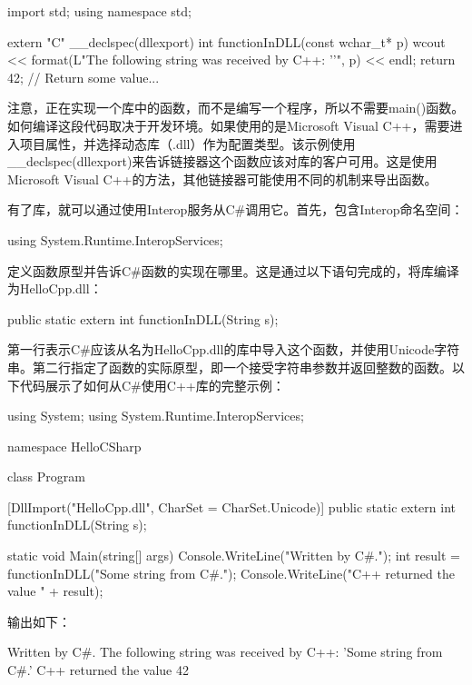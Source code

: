 \begin{cpp}
import std;
using namespace std;

extern "C"
{
    __declspec(dllexport) int functionInDLL(const wchar_t* p)
    {
        wcout << format(L"The following string was received by C++: '{}'", p)
        << endl;
        return 42; // Return some value...
    }
}
\end{cpp}

注意，正在实现一个库中的函数，而不是编写一个程序，所以不需要main()函数。如何编译这段代码取决于开发环境。如果使用的是Microsoft Visual C++，需要进入项目属性，并选择动态库（.dll）作为配置类型。该示例使用\_\_declspec(dllexport)来告诉链接器这个函数应该对库的客户可用。这是使用Microsoft Visual C++的方法，其他链接器可能使用不同的机制来导出函数。

有了库，就可以通过使用Interop服务从C\#调用它。首先，包含Interop命名空间：

\begin{cpp}
using System.Runtime.InteropServices;
\end{cpp}

定义函数原型并告诉C\#函数的实现在哪里。这是通过以下语句完成的，将库编译为HelloCpp.dll：

\begin{cpp}
[DllImport("HelloCpp.dll", CharSet = CharSet.Unicode)] public static extern int functionInDLL(String s);
\end{cpp}

第一行表示C\#应该从名为HelloCpp.dll的库中导入这个函数，并使用Unicode字符串。第二行指定了函数的实际原型，即一个接受字符串参数并返回整数的函数。以下代码展示了如何从C\#使用C++库的完整示例：

\begin{cpp}
using System;
using System.Runtime.InteropServices;

namespace HelloCSharp
{
    class Program
    {
        [DllImport("HelloCpp.dll", CharSet = CharSet.Unicode)]
        public static extern int functionInDLL(String s);

        static void Main(string[] args)
        {
            Console.WriteLine("Written by C#.");
            int result = functionInDLL("Some string from C#.");
            Console.WriteLine("C++ returned the value " + result);
        }
    }
}
\end{cpp}

输出如下：

\begin{shell}
Written by C#.
The following string was received by C++: 'Some string from C#.'
C++ returned the value 42
\end{shell}

